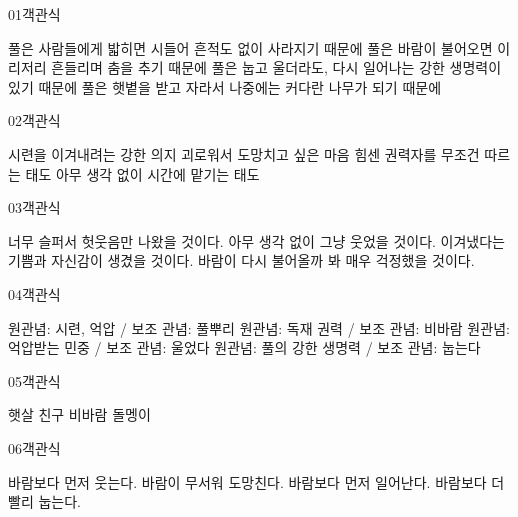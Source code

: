 \documentclass[fs95,seriesFre]{korfarm-base}
\begin{document}
\begin{kfQBlock}{01}{객관식}
\begin{kfChoices}
\kfChoice 풀은 사람들에게 밟히면 시들어 흔적도 없이 사라지기 때문에
\kfChoice 풀은 바람이 불어오면 이리저리 흔들리며 춤을 추기 때문에
\kfChoice 풀은 눕고 울더라도, 다시 일어나는 강한 생명력이 있기 때문에
\kfChoice 풀은 햇볕을 받고 자라서 나중에는 커다란 나무가 되기 때문에
\end{kfChoices}
\end{kfQBlock}
\begin{kfQBlock}{02}{객관식}
\begin{kfChoices}
\kfChoice 시련을 이겨내려는 강한 의지
\kfChoice 괴로워서 도망치고 싶은 마음
\kfChoice 힘센 권력자를 무조건 따르는 태도
\kfChoice 아무 생각 없이 시간에 맡기는 태도
\end{kfChoices}
\end{kfQBlock}
\begin{kfQBlock}{03}{객관식}
\begin{kfChoices}
\kfChoice 너무 슬퍼서 헛웃음만 나왔을 것이다.
\kfChoice 아무 생각 없이 그냥 웃었을 것이다.
\kfChoice 이겨냈다는 기쁨과 자신감이 생겼을 것이다.
\kfChoice 바람이 다시 불어올까 봐 매우 걱정했을 것이다.
\end{kfChoices}
\end{kfQBlock}
\begin{kfQBlock}{04}{객관식}
\begin{kfChoices}
\kfChoice 원관념: 시련, 억압 / 보조 관념: 풀뿌리
\kfChoice 원관념: 독재 권력 / 보조 관념: 비바람
\kfChoice 원관념: 억압받는 민중 / 보조 관념: 울었다
\kfChoice 원관념: 풀의 강한 생명력 / 보조 관념: 눕는다
\end{kfChoices}
\end{kfQBlock}
\begin{kfQBlock}{05}{객관식}
\begin{kfChoices}
\kfChoice 햇살
\kfChoice 친구
\kfChoice 비바람
\kfChoice 돌멩이
\end{kfChoices}
\end{kfQBlock}
\begin{kfQBlock}{06}{객관식}
\begin{kfChoices}
\kfChoice 바람보다 먼저 웃는다.
\kfChoice 바람이 무서워 도망친다.
\kfChoice 바람보다 먼저 일어난다.
\kfChoice 바람보다 더 빨리 눕는다.
\end{kfChoices}
\end{kfQBlock}
\end{document}
